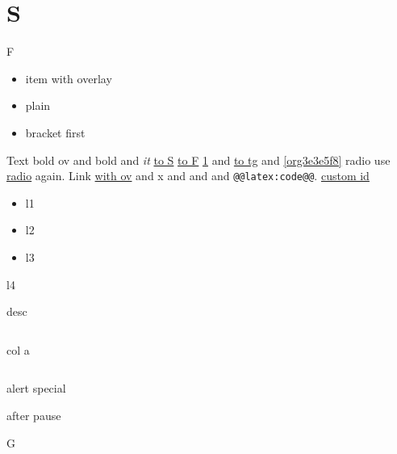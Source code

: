 \documentclass[presentation]{beamer}
\author{root}
\date{\today}
\title{}
\begin{document}
\section{S}
\label{sec:org6a34f2e}
\begin{frame}[label={sec:orga55fa6b},fragile]{F}
 \begin{itemize}
\item<2> item with overlay
\item plain
\item\relax [<3>] bracket first
\end{itemize}
Text \alert<3>{ bold ov} and \alert{bold} and \emph{ it} \hyperlink{sec:org6a34f2e}{to S} \hyperlink{sec:orga55fa6b}{to F} \ref{sec:org6a34f2e} \label{org3e3e5f8} and \hyperlink{org3e3e5f8}{to tg} and \ref{org3e3e5f8} \hypertarget{org7dd99da}{radio} use \hyperlink{org7dd99da}{radio} again.
Link \hyperlink<2>{sec:orga55fa6b}{ with ov} and \alert<2>{x} and \foo and  and \texttt{@@latex:code@@}.
\hyperlink{sec:org5b8a78b}{custom id}
\begin{itemize}[a]
\item l1
\end{itemize}
\begin{itemize}[b]
\item l2
\end{itemize}
\begin{itemize}[<+->][c]
\item l3
\end{itemize}
\begin{myenv}[<2>][d]
\item l4
\end{myenv}
\begin{description}[<2->]
\item[{term}] desc
\end{description}
\begin{columns}
\begin{column}
col a
\end{column}
\end{columns}
\begin{alertblock}
alert special
\end{alertblock}
\pause
\pause after pause
\end{frame}
\begin{frame}[label={sec:org5b8a78b}]{G}
\end{frame}
\end{document}
